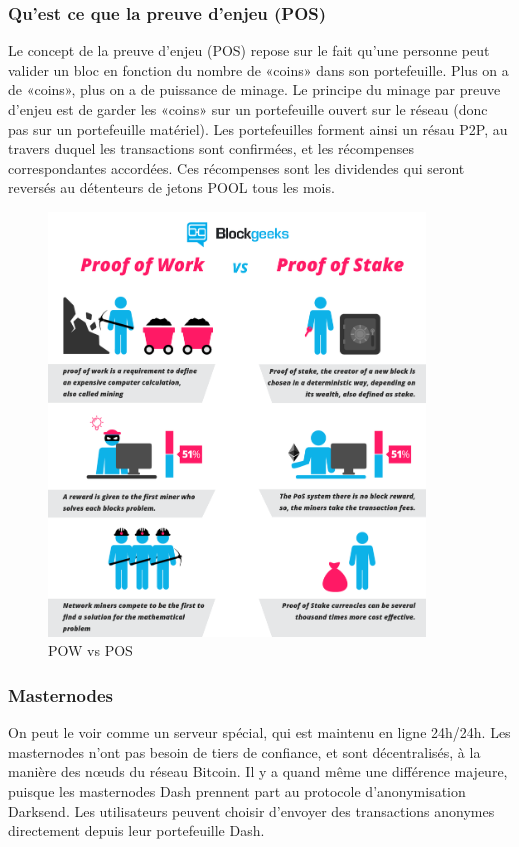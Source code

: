   \subsubsection{Qu'est ce que la preuve d'enjeu (POS)}
Le concept de la preuve d'enjeu (POS) repose sur le fait qu'une personne peut valider un bloc en fonction du nombre de «coins» dans son portefeuille. Plus on a de «coins», plus on a de puissance de minage. Le principe du minage par preuve d'enjeu est de garder les «coins» sur un portefeuille ouvert sur le réseau (donc pas sur un portefeuille matériel). Les portefeuilles forment ainsi un résau P2P, au travers duquel les transactions sont confirmées, et les récompenses correspondantes accordées. Ces récompenses sont les dividendes qui seront reversés au détenteurs de jetons POOL tous les mois.

\begin{figure}[h]
\centering
\caption{POW vs POS \cite{blockgeek}}
\includegraphics[width=10cm]{blockgeek.png}
\end{figure}

\subsubsection{Masternodes}
On peut le voir comme un serveur spécial, qui est maintenu en ligne 24h/24h. Les masternodes n'ont pas besoin de tiers de confiance, et sont décentralisés, à la manière des nœuds du réseau Bitcoin. Il y a quand même une différence majeure, puisque les masternodes Dash prennent part au protocole d'anonymisation Darksend. Les utilisateurs peuvent choisir d'envoyer des transactions anonymes directement depuis leur portefeuille Dash.

